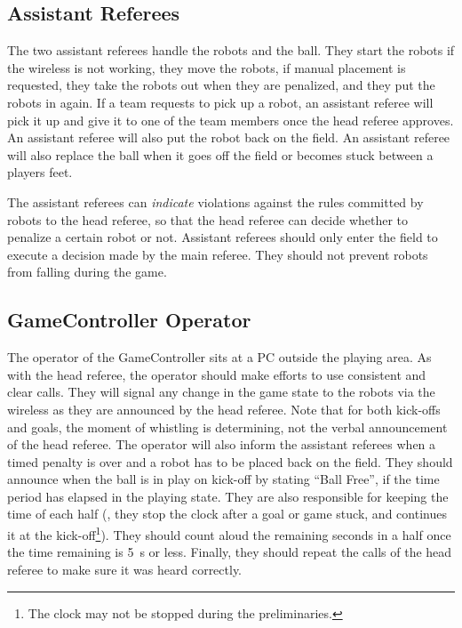 \subsection{Assistant Referees}
\label{sec:assist_referee}
The two assistant referees handle the robots and the ball. They start the robots if the wireless is not working, they move the robots, if manual placement is requested, they take the robots out when they are penalized, and they put the robots in again. If a team requests to pick up a robot, an assistant referee will pick it up and give it to one of the team members once the head referee approves. An assistant referee will also put the robot back on the field. An assistant referee will also replace the ball when it goes off the field or becomes stuck between a players feet.

The assistant referees can \textit{indicate} violations against the rules committed by robots to the head referee, so that the head referee can decide whether to penalize a certain robot or not. Assistant referees should only enter the field to execute a decision made by the main referee. They should not prevent robots from falling during the game.

\subsection{GameController Operator}
\label{sec:gameControllerOp}
The operator of the GameController sits at a PC outside the playing area.
As with the head referee, the operator should make efforts to use consistent and clear calls.
They will signal any change in the game state to the robots via the wireless as they are announced by the head referee.
Note that for both kick-offs and goals, the moment of whistling is determining, not the verbal announcement of the head referee.
The operator will also inform the assistant referees when a timed penalty is over and a robot has to be placed back on the field.
They should announce when the ball is in play on kick-off by stating ``Ball Free'', if the \KickOffBallFreeTime time period has elapsed in the playing state.
They are also responsible for keeping the time of each half (\ie, they stop the clock after a goal or game stuck, and continues it at the kick-off\footnote{The clock may not be stopped during the preliminaries.}).
They should count aloud the remaining seconds in a half once the time remaining is \qty{5}{\second} or less.
Finally, they should repeat the calls of the head referee to make sure it was heard correctly.

